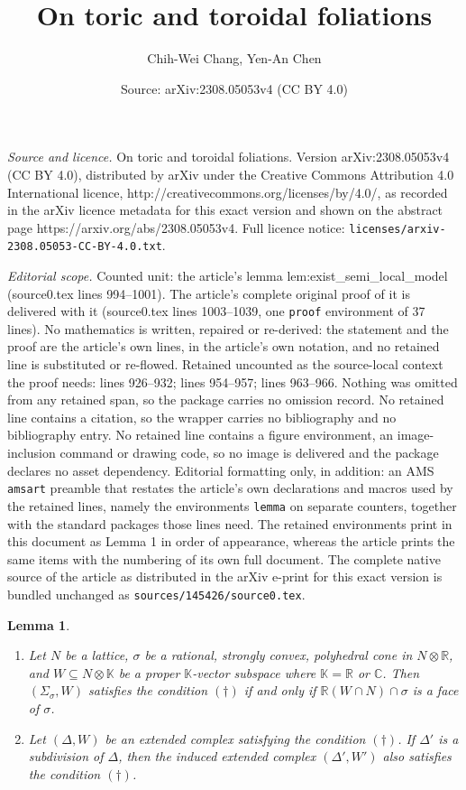 \documentclass[10pt,a4paper]{amsart}
\title{On toric and toroidal foliations}
\author{Chih-Wei Chang, Yen-An Chen}
\date{Source: arXiv:2308.05053v4 (CC BY 4.0)}
\newtheorem{lemma}{Lemma}
\newcommand\bC{{\mathbb C}}
\newcommand\bK{{\mathbb K}}
\newcommand\bR{{\mathbb R}}
\newcommand{\mb}{\mathbb}
\begin{document}
\maketitle

\noindent\emph{Source and licence.} On toric and toroidal foliations. Version arXiv:2308.05053v4 (CC BY 4.0), distributed by arXiv under the Creative Commons Attribution 4.0 International licence, http://creativecommons.org/licenses/by/4.0/, as recorded in the arXiv licence metadata for this exact version and shown on the abstract page https://arxiv.org/abs/2308.05053v4. Full licence notice: \texttt{licenses/arxiv-2308.05053-CC-BY-4.0.txt}.\par\smallskip

\noindent\textit{Editorial scope.} Counted unit: the article's lemma lem:exist\_semi\_local\_model (source0.tex lines 994--1001). The article's complete original proof of it is delivered with it (source0.tex lines 1003--1039, one \texttt{proof} environment of 37 lines). No mathematics is written, repaired or re-derived: the statement and the proof are the article's own lines, in the article's own notation, and no retained line is substituted or re-flowed.  Retained uncounted as the source-local context the proof needs: lines 926--932; lines 954--957; lines 963--966.  Nothing was omitted from any retained span, so the package carries no omission record.  No retained line contains a citation, so the wrapper carries no bibliography and no bibliography entry.  No retained line contains a figure environment, an image-inclusion command or drawing code, so no image is delivered and the package declares no asset dependency.  Editorial formatting only, in addition: an AMS \texttt{amsart} preamble that restates the article's own declarations and macros used by the retained lines, namely the environments \texttt{lemma} on separate counters, together with the standard packages those lines need.  The retained environments print in this document as Lemma 1 in order of appearance, whereas the article prints the same items with the numbering of its own full document.  The complete native source of the article as distributed in the arXiv e-print for this exact version is bundled unchanged as \texttt{sources/145426/source0.tex}.
\begin{lemma}\label{lem_property_dagger}
\begin{enumerate}
    \item  Let $N$ be a lattice, $\sigma$ be a rational, strongly convex, polyhedral cone in $N\otimes\bR$, and $W\subseteq N\otimes\bK$ be a proper $\bK$-vector subspace where $\bK=\bR$ or $\bC$. Then $(\Sigma_\sigma,W)$ satisfies the condition $(\dagger)$ if and only if $\mb R(W\cap N)\cap \sigma$ is a face of $\sigma$.
    \item Let $(\Delta,W)$ be an extended complex satisfying the condition $(\dagger)$. 
    If $\Delta'$ is a subdivision of $\Delta$, then the induced extended complex $(\Delta',W')$ also satisfies the condition $(\dagger)$. 
\end{enumerate}
\end{lemma}
\end{document}
